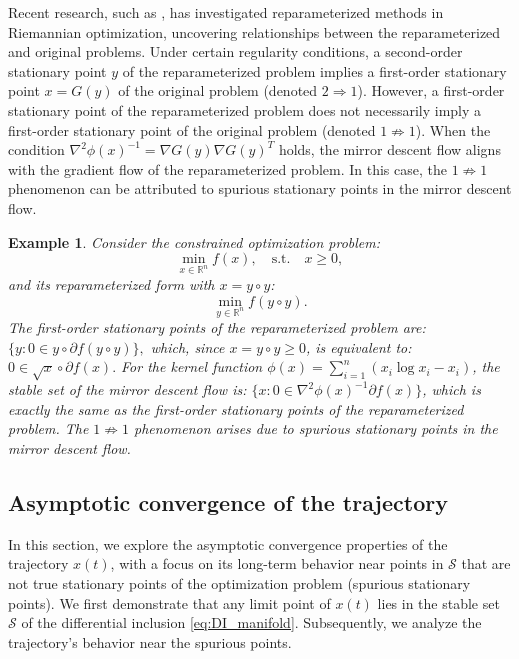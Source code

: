 \documentclass[11pt]{article}
\newtheorem{example}{Example}[section]
\begin{document}
Recent research, such as \cite{levin2025effect,tang2024optimization}, has investigated reparameterized methods in Riemannian optimization, uncovering relationships between the reparameterized and original problems. Under certain regularity conditions, a second-order stationary point $ y $ of the reparameterized problem implies a first-order stationary point $ x = G(y) $ of the original problem (denoted $ 2 \Rightarrow 1 $). However, a first-order stationary point of the reparameterized problem does not necessarily imply a first-order stationary point of the original problem (denoted $ 1 \not\Rightarrow 1 $). When the condition $ \nabla^2 \phi(x)^{-1} = \nabla G(y) \nabla G(y)^T $ holds, the mirror descent flow aligns with the gradient flow of the reparameterized problem. In this case, the $ 1 \not\Rightarrow 1 $ phenomenon can be attributed to spurious stationary points in the mirror descent flow.

\begin{example}
Consider the constrained optimization problem:
$$\min_{x \in \mathbb{R}^n} f(x), \quad \text{s.t.} \quad x \geq 0,$$ 
and its reparameterized form with $ x = y \circ y $: 
$$\min_{y \in \mathbb{R}^n} f(y \circ y).$$
The first-order stationary points of the reparameterized problem are: $\{ y : 0 \in y \circ \partial f(y \circ y) \},$ which, since $ x = y \circ y \geq 0 $, is equivalent to: $0 \in \sqrt{x} \circ \partial f(x).$ For the kernel function $ \phi(x) = \sum_{i=1}^n (x_i \log x_i - x_i) $, the stable set of the mirror descent flow is: $\{ x : 0 \in \nabla^2 \phi(x)^{-1} \partial f(x) \}$, which is exactly the same as the first-order stationary points of the reparameterized problem. The $ 1 \not\Rightarrow 1 $ phenomenon arises due to spurious stationary points in the mirror descent flow.
\end{example}



\subsection{Asymptotic convergence of the trajectory}
In this section, we explore the asymptotic convergence properties of the trajectory $ x(t) $, with a focus on its long-term behavior near points in $ \mathcal{S} $ that are not true stationary points of the optimization problem (spurious stationary points). We first demonstrate that any limit point of $ x(t) $ lies in the stable set $ \mathcal{S} $ of the differential inclusion \eqref{eq:DI_manifold}. Subsequently, we analyze the trajectory's behavior near the spurious points.
\end{document}
